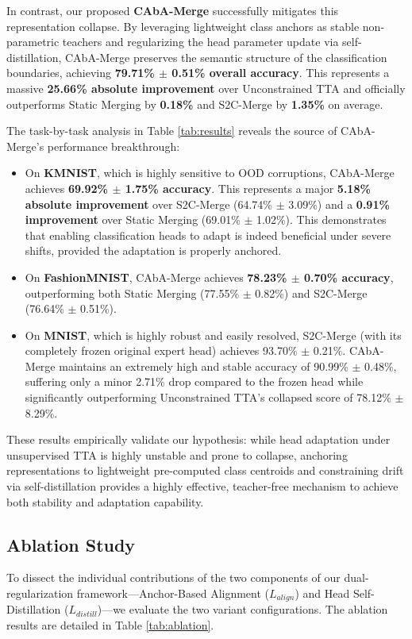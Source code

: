 \documentclass{article}
\theoremstyle{plain}
\theoremstyle{definition}
\theoremstyle{remark}
\begin{document}
In contrast, our proposed \textbf{CAbA-Merge} successfully mitigates this representation collapse. By leveraging lightweight class anchors as stable non-parametric teachers and regularizing the head parameter update via self-distillation, CAbA-Merge preserves the semantic structure of the classification boundaries, achieving \textbf{79.71\% $\pm$ 0.51\% overall accuracy}. This represents a massive \textbf{25.66\% absolute improvement} over Unconstrained TTA and officially outperforms Static Merging by \textbf{0.18\%} and S2C-Merge by \textbf{1.35\%} on average.

The task-by-task analysis in Table \ref{tab:results} reveals the source of CAbA-Merge's performance breakthrough:
\begin{itemize}
    \item On \textbf{KMNIST}, which is highly sensitive to OOD corruptions, CAbA-Merge achieves \textbf{69.92\% $\pm$ 1.75\% accuracy}. This represents a major \textbf{5.18\% absolute improvement} over S2C-Merge (64.74\% $\pm$ 3.09\%) and a \textbf{0.91\% improvement} over Static Merging (69.01\% $\pm$ 1.02\%). This demonstrates that enabling classification heads to adapt is indeed beneficial under severe shifts, provided the adaptation is properly anchored.
    \item On \textbf{FashionMNIST}, CAbA-Merge achieves \textbf{78.23\% $\pm$ 0.70\% accuracy}, outperforming both Static Merging (77.55\% $\pm$ 0.82\%) and S2C-Merge (76.64\% $\pm$ 0.51\%).
    \item On \textbf{MNIST}, which is highly robust and easily resolved, S2C-Merge (with its completely frozen original expert head) achieves 93.70\% $\pm$ 0.21\%. CAbA-Merge maintains an extremely high and stable accuracy of 90.99\% $\pm$ 0.48\%, suffering only a minor 2.71\% drop compared to the frozen head while significantly outperforming Unconstrained TTA's collapsed score of 78.12\% $\pm$ 8.29\%.
\end{itemize}

These results empirically validate our hypothesis: while head adaptation under unsupervised TTA is highly unstable and prone to collapse, anchoring representations to lightweight pre-computed class centroids and constraining drift via self-distillation provides a highly effective, teacher-free mechanism to achieve both stability and adaptation capability.

\subsection{Ablation Study}
To dissect the individual contributions of the two components of our dual-regularization framework—Anchor-Based Alignment ($L_{align}$) and Head Self-Distillation ($L_{distill}$)—we evaluate the two variant configurations.
The ablation results are detailed in Table \ref{tab:ablation}.
\end{document}
